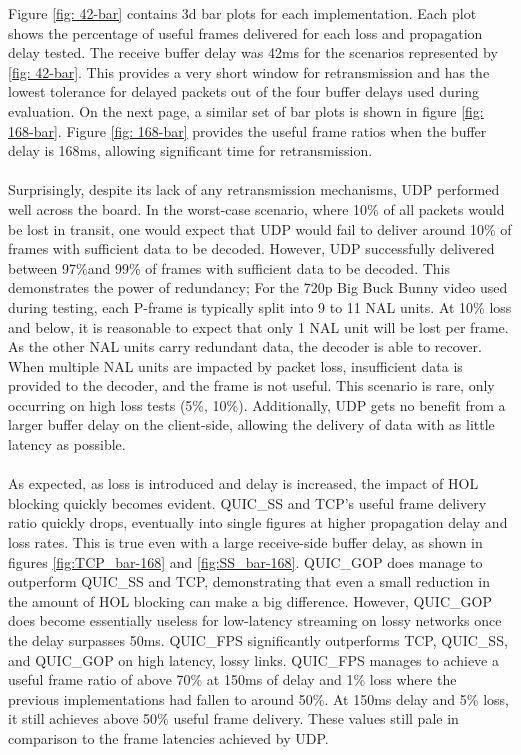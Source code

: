 \documentclass{mpaper}
\begin{document}
Figure \ref{fig: 42-bar} contains 3d bar plots for each implementation. Each plot shows the percentage of useful frames delivered for each loss and propagation delay tested. The receive buffer delay was 42ms for the scenarios represented by \ref{fig: 42-bar}. This provides a very short window for retransmission and has the lowest tolerance for delayed packets out of the four buffer delays used during evaluation. On the next page, a similar set of bar plots is shown in figure \ref{fig: 168-bar}.  Figure \ref{fig: 168-bar} provides the useful frame ratios when the buffer delay is 168ms, allowing significant time for retransmission.
\\\\
Surprisingly, despite its lack of any retransmission mechanisms, UDP performed well across the board. In the worst-case scenario, where 10\% of all packets would be lost in transit, one would expect that UDP would fail to deliver around 10\% of frames with sufficient data to be decoded. However, UDP successfully delivered between 97\%and 99\% of frames with sufficient data to be decoded. This demonstrates the power of redundancy; For the 720p Big Buck Bunny video used during testing, each P-frame is typically split into 9 to 11 NAL units. At 10\% loss and below, it is reasonable to expect that only 1 NAL unit will be lost per frame.  As the other NAL units carry redundant data, the decoder is able to recover. When multiple NAL units are impacted by packet loss, insufficient data is provided to the decoder, and the frame is not useful. This scenario is rare, only occurring on high loss tests (5\%, 10\%). Additionally, UDP gets no benefit from a larger buffer delay on the client-side, allowing the delivery of data with as little latency as possible.
\\\\
As expected, as loss is introduced and delay is increased, the impact of HOL blocking quickly becomes evident. QUIC\_SS and TCP's useful frame delivery ratio quickly drops, eventually into single figures at higher propagation delay and loss rates. This is true even with a large receive-side buffer delay, as shown in figures \ref{fig:TCP_bar-168} and \ref{fig:SS_bar-168}. QUIC\_GOP does manage to outperform QUIC\_SS and TCP, demonstrating that even a small reduction in the amount of HOL blocking can make a big difference. However, QUIC\_GOP does become essentially useless for low-latency streaming on lossy networks once the delay surpasses 50ms. QUIC\_FPS significantly outperforms TCP, QUIC\_SS, and QUIC\_GOP on high latency, lossy links. QUIC\_FPS manages to achieve a useful frame ratio of above 70\% at 150ms of delay and 1\% loss where the previous implementations had fallen to around 50\%. At 150ms delay and 5\% loss, it still achieves above 50\% useful frame delivery. These values still pale in comparison to the frame latencies achieved by UDP.
\end{document}
